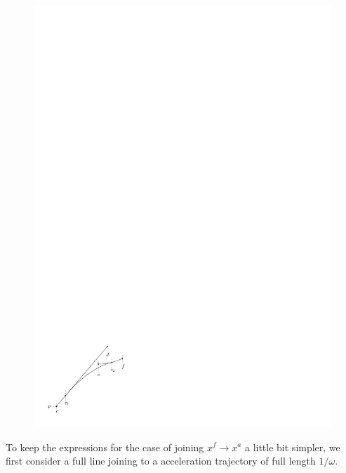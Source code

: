 \documentclass[a4paper]{report}
\theoremstyle{definition}
\theoremstyle{plain}
\begin{document}
\begin{figure}
\begin{minipage}{.45\textwidth}
  \includegraphics[width=0.9\linewidth]{figures/motion/lemma_full_acc}
  \label{fig:full_acc}
\end{minipage}
\end{figure}

To keep the expressions for the case of joining $x^{f} \rightarrow x^{a}$ a
little bit simpler, we first consider a full line joining to a acceleration
trajectory of full length $1/\omega$.
\end{document}
